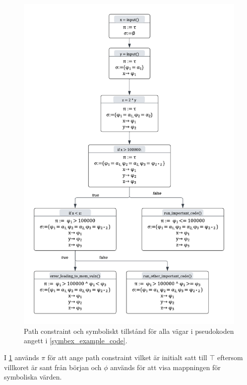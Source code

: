 \begin{figure}[H]
\centering
\includegraphics[scale=0.5]{figures/final_symbolic_example_graph.png}
\caption{Path constraint och symboliskt tillstånd för alla vägar i
    pseudokoden angett i \ref{symbex_example_code}.}
\label{symbex_example_graph}
\end{figure}

I \ref{symbex_example_graph} används $\pi$ för att ange path constraint vilket
är initialt satt till $\top$ eftersom villkoret är sant från början och $\phi$
används för att visa mappningen för symboliska värden.